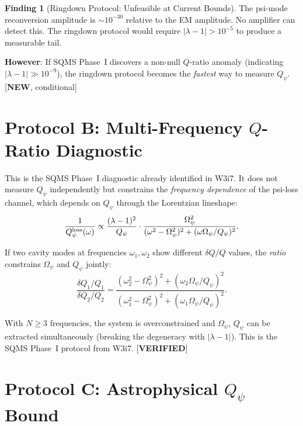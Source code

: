 \documentclass[11pt]{article}
\newcommand{\lam}{\lambda}
\newcommand{\Opsi}{\Omega_\psi}
\newcommand{\Qpsi}{Q_\psi}
\newcommand{\lbone}{|\lam - 1|}
\theoremstyle{definition}
\newtheorem{finding}[theorem]{Finding}
\theoremstyle{remark}
\begin{document}
\begin{finding}[Ringdown Protocol: Unfeasible at Current Bounds]
\label{find:ringdown_unfeasible}
The psi-mode reconversion amplitude is $\sim 10^{-30}$ relative to
the EM amplitude. No amplifier can detect this. The ringdown protocol
would require $\lbone > 10^{-5}$ to produce a measurable tail.

\textbf{However}: If SQMS Phase~I discovers a non-null $Q$-ratio
anomaly (indicating $\lbone \gg 10^{-9}$), the ringdown protocol
becomes the \emph{fastest} way to measure $\Qpsi$. [\textbf{NEW},
conditional]
\end{finding}

\section{Protocol B: Multi-Frequency $Q$-Ratio Diagnostic}
\label{sec:multi_freq}

This is the SQMS Phase~I diagnostic already identified in W3i7.
It does not measure $\Qpsi$ independently but constrains the
\emph{frequency dependence} of the psi-loss channel, which depends
on $\Qpsi$ through the Lorentzian lineshape:
\begin{equation}
\frac{1}{Q_\psi^{\rm loss}(\omega)} \propto
\frac{(\lam-1)^2}{\Qpsi}\cdot
\frac{\Opsi^2}{(\omega^2 - \Opsi^2)^2 + (\omega\Opsi/\Qpsi)^2}.
\label{eq:lorentzian}
\end{equation}

If two cavity modes at frequencies $\omega_1, \omega_2$ show different
$\delta Q/Q$ values, the \emph{ratio} constrains $\Opsi$ and $\Qpsi$
jointly:
\begin{equation}
\frac{\delta Q_1/Q_1}{\delta Q_2/Q_2}
= \frac{(\omega_2^2 - \Opsi^2)^2 + (\omega_2\Opsi/\Qpsi)^2}
{(\omega_1^2 - \Opsi^2)^2 + (\omega_1\Opsi/\Qpsi)^2}.
\label{eq:Q_ratio}
\end{equation}

With $N \geq 3$ frequencies, the system is overconstrained and
$\Opsi$, $\Qpsi$ can be extracted simultaneously (breaking the
degeneracy with $\lbone$). This is the SQMS Phase~I protocol
from W3i7. [\textbf{VERIFIED}]

\section{Protocol C: Astrophysical $\Qpsi$ Bound}
\label{sec:astro_Qpsi}
\end{document}
